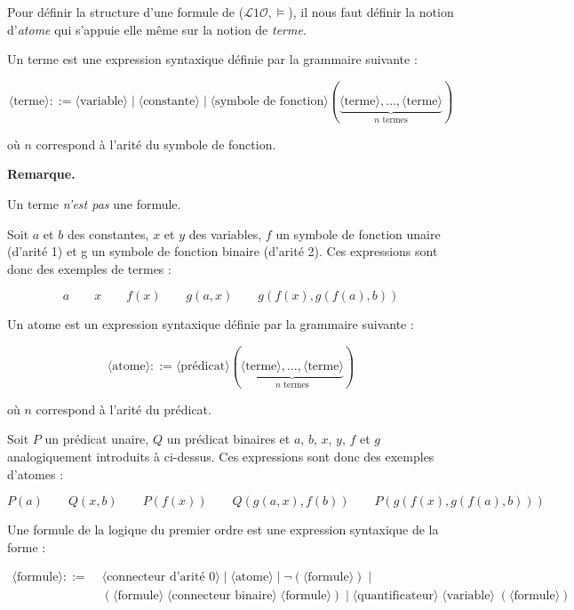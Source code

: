 \documentclass[11pt]{article}
\newenvironment{remarque}{%
    \begin{mdframed}[
        linecolor=sectioncolor!40,
        linewidth=0.8pt,
        backgroundcolor=sectioncolor!5,
        innerleftmargin=10pt,
        innerrightmargin=10pt,
        innertopmargin=6pt,
        innerbottommargin=6pt,
        skipabove=8pt,
        skipbelow=8pt
    ]
    \noindent\textbf{\small\color{sectioncolor}Remarque.}\enspace\small\itshape
}{%
    \end{mdframed}
}
\begin{document}
Pour définir la structure d'une formule de ($\mathcal{L}1\mathcal{O}, \models$), il nous faut définir la notion d'\textit{atome} qui s'appuie elle même sur la notion de \textit{terme}.

Un terme est une expression syntaxique définie par la grammaire suivante :

\vspace{0.2cm}
\[
\langle\text{terme}\rangle ::= \langle\text{variable}\rangle \mid
\langle\text{constante}\rangle \mid
\langle\text{symbole de fonction}\rangle(\underbrace{\langle\text{terme}\rangle, \ldots,
\langle\text{terme}\rangle}_{n \text{ termes}})
\]

\noindent où $n$ correspond à l'arité du symbole de fonction.

\begin{remarque}
    Un terme \emph{n'est pas} une formule.
\end{remarque}

Soit $a$ et $b$ des constantes, $x$ et $y$ des variables, $f$ un symbole de fonction unaire (d'arité 1) et g un symbole de fonction binaire (d'arité 2). Ces expressions sont donc des exemples de termes :

$$
a \qquad x \qquad f(x) \qquad g(a, x) \qquad g(f(x), g(f(a), b))
$$

Un atome est un expression syntaxique définie par la grammaire suivante :

\vspace{0.2cm}
\[
\langle\text{atome}\rangle ::= \langle\text{prédicat}\rangle
(\underbrace{\langle\text{terme}\rangle, \ldots,
\langle\text{terme}\rangle}_{n \text{ termes}})
\]

\noindent où $n$ correspond à l'arité du prédicat.
\newpage

Soit $P$ un prédicat unaire, $Q$ un prédicat binaires et $a$, $b$, $x$, $y$, $f$ et $g$ analogiquement introduits à ci-dessus. Ces expressions sont donc des exemples d'atomes :

$$
P(a) \qquad Q(x, b) \qquad P(f(x)) \qquad Q(g(a, x), f(b)) \qquad P(g(f(x), g(f(a), b)))
$$

Une formule de la logique du premier ordre est une expression syntaxique de la forme :

\vspace{0.2cm}
\[
\begin{align*}
\langle\text{formule}\rangle ::= \; 
&\langle\text{connecteur d'arité 0}\rangle \mid
\langle\text{atome}\rangle \mid
\neg(\langle\text{formule}\rangle) \mid \\
&(\langle\text{formule}\rangle\;\langle\text{connecteur binaire}\rangle\;\langle\text{formule}\rangle) \mid
\langle\text{quantificateur}\rangle\;\langle\text{variable}\rangle\;(\langle\text{formule}\rangle)
\end{align*}
\]
\end{document}
